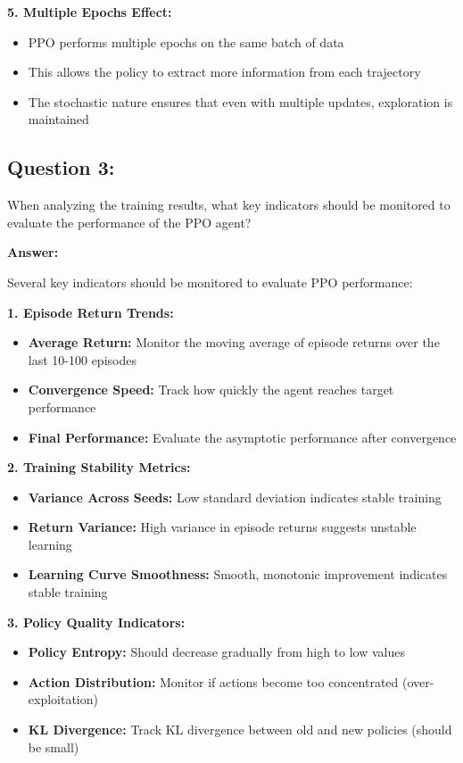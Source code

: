\documentclass[12pt]{article}
\begin{document}
{{{\textbf{5. Multiple Epochs Effect:}
\begin{itemize}
    \item PPO performs multiple epochs on the same batch of data
    \item This allows the policy to extract more information from each trajectory
    \item The stochastic nature ensures that even with multiple updates, exploration is maintained
\end{itemize}

\subsection{Question 3:} When analyzing the training results, what key indicators should be monitored to evaluate the performance of the PPO agent?

\textbf{Answer:}

Several key indicators should be monitored to evaluate PPO performance:

\textbf{1. Episode Return Trends:}
\begin{itemize}
    \item \textbf{Average Return:} Monitor the moving average of episode returns over the last 10-100 episodes
    \item \textbf{Convergence Speed:} Track how quickly the agent reaches target performance
    \item \textbf{Final Performance:} Evaluate the asymptotic performance after convergence
\end{itemize}

\textbf{2. Training Stability Metrics:}
\begin{itemize}
    \item \textbf{Variance Across Seeds:} Low standard deviation indicates stable training
    \item \textbf{Return Variance:} High variance in episode returns suggests unstable learning
    \item \textbf{Learning Curve Smoothness:} Smooth, monotonic improvement indicates stable training
\end{itemize}

\textbf{3. Policy Quality Indicators:}
\begin{itemize}
    \item \textbf{Policy Entropy:} Should decrease gradually from high to low values
    \item \textbf{Action Distribution:} Monitor if actions become too concentrated (over-exploitation)
    \item \textbf{KL Divergence:} Track KL divergence between old and new policies (should be small)
\end{itemize}

}}}
\end{document}
